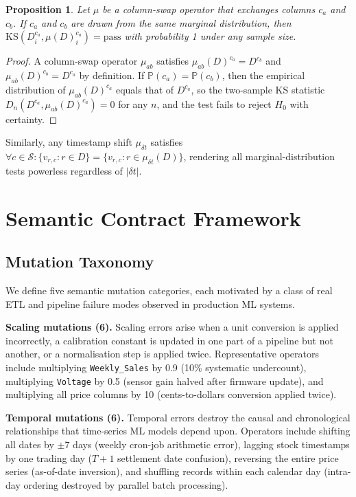\documentclass[journal]{IEEEtran}
\newtheorem{proposition}{Proposition}
\begin{document}
\begin{proposition}
Let $\mu$ be a column-swap operator that exchanges columns $c_a$ and $c_b$.
If $c_a$ and $c_b$ are drawn from the same marginal distribution,
then $\mathrm{KS}(D_i^{c_a}, \mu(D)_i^{c_a}) = \mathrm{pass}$ with
probability 1 under any sample size.
\end{proposition}

\begin{proof}
A column-swap operator $\mu_{ab}$ satisfies
$\mu_{ab}(D)^{c_a} = D^{c_b}$ and $\mu_{ab}(D)^{c_b} = D^{c_a}$
by definition. If $\mathbb{P}(c_a) = \mathbb{P}(c_b)$, then the
empirical distribution of $\mu_{ab}(D)^{c_a}$ equals that of
$D^{c_a}$, so the two-sample KS statistic
$D_n(D^{c_a}, \mu_{ab}(D)^{c_a}) = 0$ for any $n$, and
the test fails to reject $H_0$ with certainty.
\end{proof}

Similarly, any timestamp shift $\mu_{\delta t}$ satisfies
$\forall c \in \mathcal{S}: \{v_{r,c} : r \in D\} = \{v_{r,c} : r \in \mu_{\delta t}(D)\}$,
rendering all marginal-distribution tests powerless regardless of $|\delta t|$.

\section{Semantic Contract Framework}
\label{sec:framework}

\subsection{Mutation Taxonomy}

We define five semantic mutation categories, each motivated by a class of
real ETL and pipeline failure modes observed in production ML systems.

\textbf{Scaling mutations (6).}  Scaling errors arise when a unit conversion
is applied incorrectly, a calibration constant is updated in one part of a
pipeline but not another, or a normalisation step is applied twice.
Representative operators include multiplying \texttt{Weekly\_Sales} by 0.9
(10\% systematic undercount), multiplying \texttt{Voltage} by 0.5 (sensor
gain halved after firmware update), and multiplying all price columns by 10
(cents-to-dollars conversion applied twice).

\textbf{Temporal mutations (6).}  Temporal errors destroy the causal and
chronological relationships that time-series ML models depend upon.
Operators include shifting all dates by $\pm 7$ days (weekly cron-job
arithmetic error), lagging stock timestamps by one trading day ($T+1$
settlement date confusion), reversing the entire price series (as-of-date
inversion), and shuffling records within each calendar day (intra-day
ordering destroyed by parallel batch processing).
\end{document}
